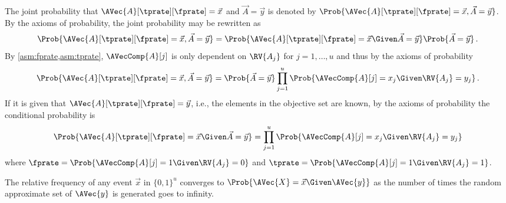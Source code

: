 \documentclass[ ../main.tex]{subfiles}
\begin{document}
The joint probability that $\AVec{A}[\tprate][\fprate] = \vec{x}$ and $\vec{A} = \vec{y}$ is denoted by $\Prob{\AVec{A}[\tprate][\fprate] = \vec{x},\vec{A} = \vec{y}}$.
By the axioms of probability, the joint probability may be rewritten as
\begin{equation}
    \Prob{\AVec{A}[\tprate][\fprate] = \vec{x},\vec{A} = \vec{y}} =
        \Prob{\AVec{A}[\tprate][\fprate] = \vec{x} \Given \vec{A} = \vec{y}}
        \Prob{\vec{A} = \vec{y}}\,.
\end{equation}
By \cref{asm:fprate,asm:tprate}, $\AVecComp{A}[j]$ is only dependent on 
$\RV{A_j}$ for $j=1,\ldots,u$ and thus by the axioms of probability
\begin{equation}
    \Prob{\AVec{A}[\tprate][\fprate] = \vec{x},\vec{A} = \vec{y}} = 
    \Prob{\vec{A} = \vec{y}} 
        \prod_{j=1}^{u} \Prob{\AVecComp{A}[j] = x_j \Given \RV{A_j} = y_j}\,.
\end{equation}
If it is given that $\AVec{A}[\tprate][\fprate] = \vec{y}$, i.e., the elements in the 
objective set are known, by the axioms of probability the conditional 
probability is
\begin{equation}
    \Prob{\AVec{A}[\tprate][\fprate] = \vec{x} \Given \vec{A} = \vec{y}} = \prod_{j=1}^{u} 
    \Prob{\AVecComp{A}[j] = x_j \Given \RV{A_j} = y_j}
\end{equation}
where $\fprate = \Prob{\AVecComp{A}[j]=1 \Given \RV{A_j}=0}$ and $\tprate = \Prob{\AVecComp{A}[j]=1 \Given \RV{A_j}=1}$.




The relative frequency of any event $\vec{x}$ in $\{0,1\}^u$ converges to $\Prob{\AVec{X} = \vec{x} \Given \AVec{y}}$ as the number of times the random approximate set of $\AVec{y}$ is generated goes to infinity.



\end{document}
